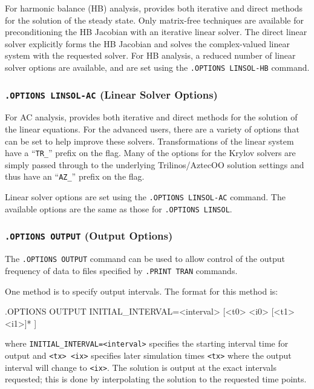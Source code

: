 For harmonic balance (HB) analysis, \Xyce{} provides both iterative 
and direct methods for the solution of the steady state.  Only matrix-free techniques
are available for preconditioning the HB Jacobian with an iterative linear solver.
The direct linear solver explicitly forms the HB Jacobian and solves the complex-valued
linear system with the requested solver.
For HB analysis, a reduced number of linear solver options are available,  
and are set using the \texttt{.OPTIONS LINSOL-HB} command.



\subsubsection{\texttt{.OPTIONS LINSOL-AC} (Linear Solver Options)}

For AC analysis, \Xyce{} provides both iterative and direct methods for the
solution of the linear equations. For the advanced users, there are a variety 
of options that can be set to help improve these solvers.  Transformations 
of the linear system have a ``\verb+TR_+'' prefix on the flag.  Many of the 
options for the Krylov solvers are simply passed through to the underlying
Trilinos/AztecOO
solution settings and thus have an ``\verb+AZ_+'' prefix on the flag.

Linear solver options are set using the \texttt{.OPTIONS LINSOL-AC}
command.  The available options
are the same as those for \texttt{.OPTIONS LINSOL}.


\subsubsection{\texttt{.OPTIONS OUTPUT} (Output Options)}

The   \verb+.OPTIONS OUTPUT+
command can be used to allow control of the output frequency of data to files specified
by  \verb+.PRINT TRAN+ commands.  

One method is to specify output intervals.  The format for this method is:
\begin{vquote}
.OPTIONS OUTPUT INITIAL_INTERVAL=<interval> [<t0> <i0> [<t1> <i1>]* ]
\end{vquote}
where \verb+INITIAL_INTERVAL=<interval>+ specifies the starting interval time
for output and \verb+<tx> <ix>+ specifies later simulation times \verb+<tx>+
where the output interval will change to \verb+<ix>+. The solution is output at the
exact intervals requested; this is done by interpolating the solution
to the requested time points.

